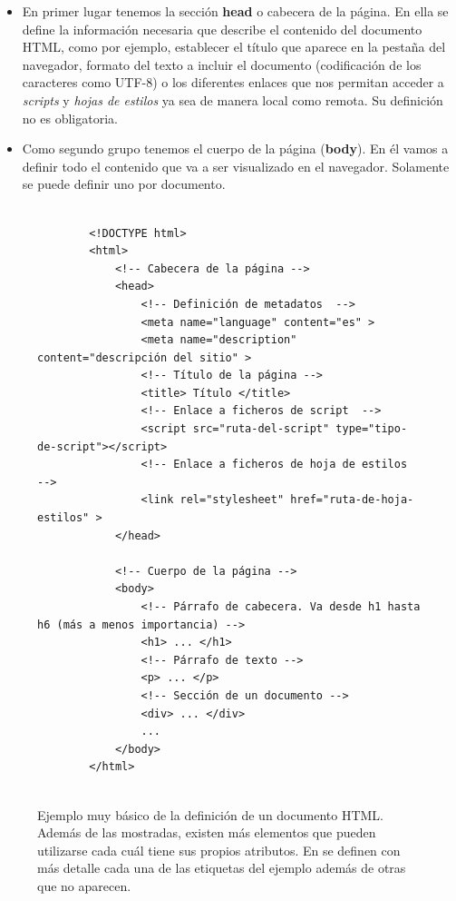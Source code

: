 \documentclass[../main.tex]{subfiles}
\begin{document}
    \begin{itemize}
        \item En primer lugar tenemos la sección \textbf{head} o cabecera de la página. En ella se define la información necesaria que describe el contenido del documento HTML, como por ejemplo, establecer el título que aparece en la pestaña del navegador, formato del texto a incluir el documento (codificación de los caracteres como UTF-8) o los diferentes enlaces que nos permitan acceder a \textit{scripts} y \textit{hojas de estilos} ya sea de manera local como remota. Su definición no es obligatoria.
        
        \item Como segundo grupo tenemos el cuerpo de la página (\textbf{body}). En él vamos a definir todo el contenido que va a ser visualizado en el navegador. Solamente se puede definir uno por documento.
    
    \end{itemize}
    

    
    \begin{figure}[!h]
        \centering
        \begin{verbatim}
        
        <!DOCTYPE html>
        <html>
            <!-- Cabecera de la página -->
            <head>
                <!-- Definición de metadatos  -->
                <meta name="language" content="es" > 
                <meta name="description" content="descripción del sitio" > 
                <!-- Título de la página -->
                <title> Título </title>
                <!-- Enlace a ficheros de script  -->
                <script src="ruta-del-script" type="tipo-de-script"></script>
                <!-- Enlace a ficheros de hoja de estilos  -->
                <link rel="stylesheet" href="ruta-de-hoja-estilos" >
            </head>
            
            <!-- Cuerpo de la página -->
            <body>
                <!-- Párrafo de cabecera. Va desde h1 hasta h6 (más a menos importancia) -->
                <h1> ... </h1>
                <!-- Párrafo de texto -->
                <p> ... </p>
                <!-- Sección de un documento -->
                <div> ... </div>
                ...
            </body>
        </html>
        
        \end{verbatim}
        \caption{Ejemplo muy básico de la definición de un documento HTML. Además de las mostradas, existen más elementos que pueden utilizarse cada cuál tiene sus propios atributos. En \cite{etiquetasbasicashtml} se definen con más detalle cada una de las etiquetas del ejemplo además de otras que no aparecen.}
        \label{fig:estructura_documento_html_I}
    \end{figure}
\end{document}
